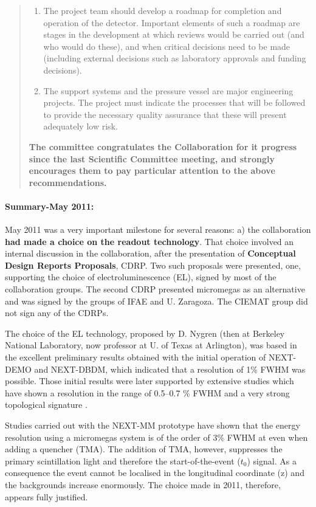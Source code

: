 \begin{quotation}
\begin{enumerate}
\item The project team should develop a roadmap for completion and operation of the detector. Important elements of such a roadmap are stages in the development at which reviews would be carried out (and who would do these), and when critical decisions need to be made (including external decisions such as laboratory approvals and funding decisions).
\item The support systems and the pressure vessel are major engineering projects. The project must indicate the processes that will be followed to provide the necessary quality assurance that these will present adequately low risk.
\end{enumerate}

{\bf The committee congratulates the Collaboration for it progress since the last Scientific Committee meeting, and strongly encourages them to pay particular attention to the above recommendations. }

\end{quotation}

\paragraph{Summary-May 2011:} May 2011 was a very important milestone for several reasons: a) the collaboration 
{\bf had made a choice on the readout technology}. That choice involved an internal discussion in the collaboration, after the presentation of {\bf Conceptual Design Reports Proposals}, CDRP. Two such proposals were presented, one, supporting the choice of electroluminescence (EL), signed by most of the collaboration groups. The second CDRP presented micromegas as an alternative and was signed by the groups of IFAE and U. Zaragoza. The CIEMAT group did not sign any of the CDRPs.

The choice of the EL technology, proposed by D. Nygren (then at Berkeley National Laboratory, now professor at U. of Texas at Arlington), was based in the excellent preliminary results obtained with the initial operation of NEXT-DEMO and NEXT-DBDM, which indicated that a resolution of 1\% FWHM was possible. Those initial results were later supported by extensive studies which have shown a resolution in the range of 0.5--0.7 \% FWHM  \cite{Alvarez:2012yxw, Alvarez:2012zsz,Alvarez:2012hu,Alvarez:2013gxa,Lorca:2014sra,Renner:2014mha,Serra:2014zda} and a very strong topological signature  \cite{Ferrario:2015kta}. 

Studies carried out with the NEXT-MM prototype have shown that the energy resolution using a micromegas system is of the order of
3\% FWHM at \Qbb \cite{Alvarez:2013oha,Alvarez:2013kqa} even when adding a quencher (TMA). The addition of TMA, however,  suppresses the primary scintillation light and therefore the start-of-the-event ($t_0$) signal. As a consequence the event cannot be localised in the longitudinal coordinate (z) and the backgrounds increase enormously. The choice made in 2011, therefore, appears fully justified. 

